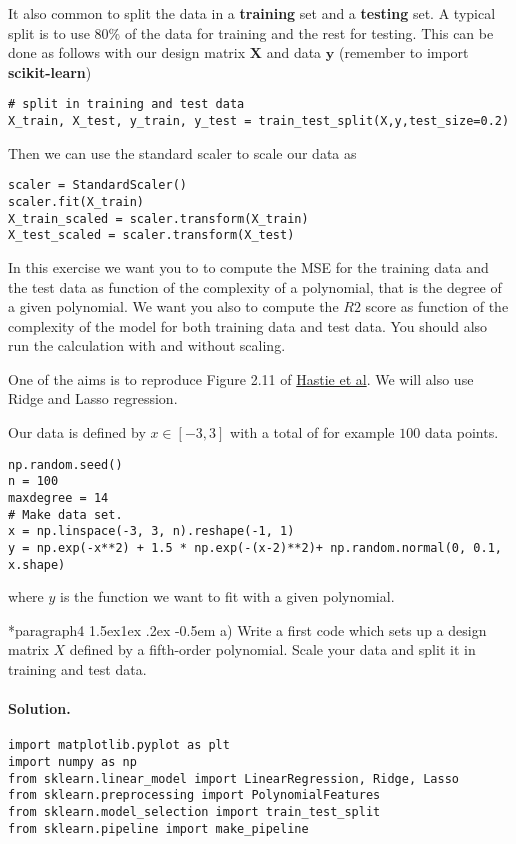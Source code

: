 \documentclass[%
oneside,                 %
final,                   %
10pt]{article}
\makeatletter
\newenvironment{doconceexercise}{}{}
\newcommand\subex{\@startsection*{paragraph}{4}{\z@}%
                  {1.5ex\@plus1ex \@minus.2ex}%
                  {-0.5em}%
                  {\normalfont\normalsize\bfseries}}
\makeatother
\begin{document}
\begin{doconceexercise}
It also common to split the data in a \textbf{training} set and a \textbf{testing} set. A typical split is to use $80\%$ of the data for training and the rest
for testing. This can be done as follows with our design matrix $\bm{X}$ and data $\bm{y}$ (remember to import \textbf{scikit-learn})
\begin{verbatim}
# split in training and test data
X_train, X_test, y_train, y_test = train_test_split(X,y,test_size=0.2)
\end{verbatim}
Then we can use the standard scaler to scale our data as
\begin{verbatim}
scaler = StandardScaler()
scaler.fit(X_train)
X_train_scaled = scaler.transform(X_train)
X_test_scaled = scaler.transform(X_test)
\end{verbatim}


In this exercise we want you to to compute the MSE for the training
data and the test data as function of the complexity of a polynomial,
that is the degree of a given polynomial. We want you also to compute the $R2$ score as function of the complexity of the model for both training data and test data.  You should also run the calculation with and without scaling. 

One of 
the aims is to reproduce Figure 2.11 of \href{{https://github.com/CompPhysics/MLErasmus/blob/master/doc/Textbooks/elementsstat.pdf}}{Hastie et al}.
We will also use Ridge and Lasso regression. 


Our data is defined by $x\in [-3,3]$ with a total of for example $100$ data points.
\begin{verbatim}
np.random.seed()
n = 100
maxdegree = 14
# Make data set.
x = np.linspace(-3, 3, n).reshape(-1, 1)
y = np.exp(-x**2) + 1.5 * np.exp(-(x-2)**2)+ np.random.normal(0, 0.1, x.shape)
\end{verbatim}
where $y$ is the function we want to fit with a given polynomial.


\subex{a)}
Write a first code which sets up a design matrix $X$ defined by a fifth-order polynomial.  Scale your data and split it in training and test data.


\paragraph{Solution.}
\begin{verbatim}
import matplotlib.pyplot as plt
import numpy as np
from sklearn.linear_model import LinearRegression, Ridge, Lasso
from sklearn.preprocessing import PolynomialFeatures
from sklearn.model_selection import train_test_split
from sklearn.pipeline import make_pipeline



\end{verbatim}
\end{doconceexercise}
\end{document}
